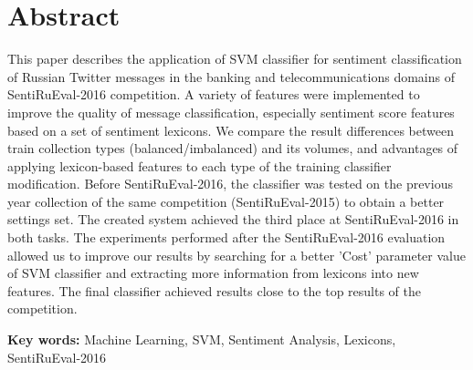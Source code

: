 \section*{Abstract}
This paper describes the application of SVM classifier for sentiment
classification of Russian Twitter messages in the banking and telecommunications
domains of SentiRuEval-2016 competition. A variety of features were implemented
to improve the quality of message classification, especially sentiment score
features based on a set of sentiment lexicons. We compare the result differences
between train collection types (balanced/imbalanced) and its volumes, and
advantages of applying lexicon-based features to each type of the training
classifier modification. Before SentiRuEval-2016, the classifier was tested on
the previous year collection of the same competition (SentiRuEval-2015) to
obtain a better settings set. The created system achieved the third place at
SentiRuEval-2016 in both tasks. The experiments performed after the SentiRuEval-2016
evaluation allowed us to improve our results by searching for a better 'Cost'
parameter value of SVM classifier and extracting more information from lexicons
into new features. The final classifier achieved results close to the top results
of the competition.

{\bf Key words:} Machine Learning, SVM, Sentiment Analysis, Lexicons,
SentiRuEval-2016
